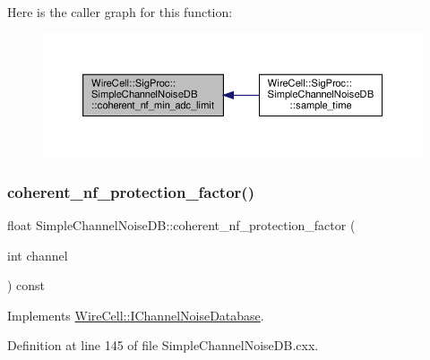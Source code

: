 Here is the caller graph for this function\+:
\nopagebreak
\begin{figure}[H]
\begin{center}
\leavevmode
\includegraphics[width=350pt]{class_wire_cell_1_1_sig_proc_1_1_simple_channel_noise_d_b_ab501b262245b5c052abd49fd0d67c803_icgraph}
\end{center}
\end{figure}
\mbox{\label{class_wire_cell_1_1_sig_proc_1_1_simple_channel_noise_d_b_aa17316b608537c3cf2c30ab600092bac}} 
\subsubsection{\texorpdfstring{coherent\+\_\+nf\+\_\+protection\+\_\+factor()}{coherent\_nf\_protection\_factor()}}
{\footnotesize\ttfamily float Simple\+Channel\+Noise\+D\+B\+::coherent\+\_\+nf\+\_\+protection\+\_\+factor (\begin{DoxyParamCaption}\item[{int}]{channel }\end{DoxyParamCaption}) const\hspace{0.3cm}{\ttfamily [virtual]}}



Implements \hyperlink{class_wire_cell_1_1_i_channel_noise_database_a4572de7acbdd4427cc4c409193abaae8}{Wire\+Cell\+::\+I\+Channel\+Noise\+Database}.



Definition at line 145 of file Simple\+Channel\+Noise\+D\+B.\+cxx.

